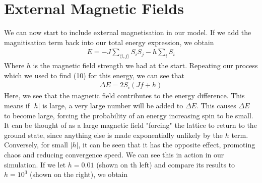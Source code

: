 \documentclass{article}
\newcommand{\la}{\langle}
\newcommand{\ra}{\rangle}
\begin{document}
\section{External Magnetic Fields}
We can now start to include external magnetisation in our model. If we add the magnitisation 
term back into our total energy expression, we obtain 
\begin{align}
    E=-J\sum_{\la i,j\ra}S_iS_j-h\sum_iS_i
\end{align}
Where $h$ is the magnetic field strength we had at the start. Repeating our process which we used to find (10) for this energy, 
we can see that 
\begin{align}
    \Delta E=2S_i(Jf+h)
\end{align}
Here, we see that the magnetic field contributes to the energy difference. This means 
if $|h|$ is large, a very large number will be added to $\Delta E$. 
This causes $\Delta E$ to become large, forcing the probability of an energy increasing spin to be small. It can 
be thought of as a large magnetic field "forcing" the lattice to return to the ground state, 
since anything else is made exponentially unlikely by the $h$ term. Conversely, for small $|h|$, it can be seen that 
it has the opposite effect, promoting chaos and reducing convergence speed. We can see
this in action in our simulation. If we let $h=0.01$ (shown on th left) 
and compare its
results to $h=10^3$ (shown on the right), we obtain 
\end{document}
